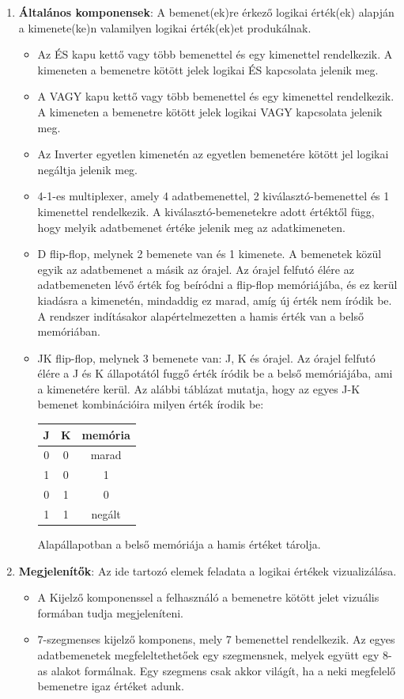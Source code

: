 \begin{enumerate}
\item \textbf{Általános komponensek}: A bemenet(ek)re érkező logikai érték(ek) alapján a kimenete(ke)n valamilyen logikai érték(ek)et produkálnak.
\begin{itemize}
\setlength{\itemsep}{0cm}%
\setlength{\parskip}{0cm}%
\item Az ÉS kapu kettő vagy több bemenettel és egy kimenettel rendelkezik. A kimeneten a bemenetre kötött jelek logikai ÉS kapcsolata jelenik meg. 
\item A VAGY kapu kettő vagy több bemenettel és egy kimenettel rendelkezik. A kimeneten a bemenetre kötött jelek logikai VAGY kapcsolata jelenik meg.
\item Az Inverter egyetlen kimenetén az egyetlen bemenetére kötött jel logikai negáltja jelenik meg.
\item 4-1-es multiplexer, amely 4 adatbemenettel, 2 kiválasztó-bemenettel és 1 kimenettel rendelkezik. A kiválasztó-bemenetekre adott értéktől függ, hogy melyik adatbemenet értéke jelenik meg az adatkimeneten.
\item D flip-flop, melynek 2 bemenete van és 1 kimenete. A bemenetek közül egyik az adatbemenet a másik az órajel. Az órajel felfutó élére az adatbemeneten lévő érték fog beíródni a flip-flop memóriájába, és ez kerül kiadásra a kimenetén, mindaddig ez marad, amíg új érték nem íródik be. A rendszer indításakor alapértelmezetten a hamis érték van a belső memóriában.
\item JK flip-flop, melynek 3 bemenete van: J, K és órajel. Az órajel felfutó élére a J és K állapotától fuggő érték íródik be a belső memóriájába, ami a kimenetére kerül. Az alábbi táblázat mutatja, hogy az egyes J-K bemenet kombinációira milyen érték írodik be:
\begin{center}
\begin{tabular}{|c|c|c|}
\hline
J & K & memória\\\hline
0 & 0 & marad\\\hline
1 & 0 & 1\\\hline
0 & 1 & 0\\\hline
1 & 1 & negált\\\hline
\end{tabular}
\vspace{10pt}
\end{center}
Alapállapotban a belső memóriája a hamis értéket tárolja.
\end{itemize}

\item \textbf{Megjelenítők}: Az ide tartozó elemek feladata a logikai értékek vizualizálása.
\begin{itemize}
\setlength{\itemsep}{0cm}%
\setlength{\parskip}{0cm}%
\item A Kijelző komponenssel a felhasználó a bemenetre kötött jelet vizuális formában tudja megjeleníteni.
\item 7-szegmenses kijelző komponens, mely 7 bemenettel rendelkezik. Az egyes adatbemenetek megfe\-leltethetőek egy szegmensnek, melyek együtt egy 8-as alakot formálnak. Egy szegmens csak akkor világít, ha a neki megfelelő bemenetre igaz értéket adunk.
\end{itemize}


\end{enumerate}
